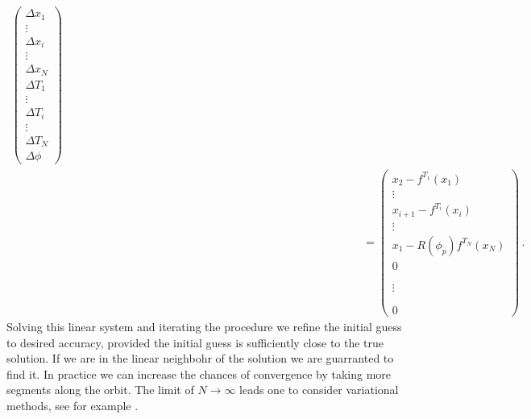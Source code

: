 \begin{eqnarray*}
{     \left(\begin{array}{c}
        \Delta x_1 \\
	\vdots\\
	\Delta x_i \\
	\vdots\\
	\Delta x_N \\
        \Delta T_1 \\
	\vdots	\\
	\Delta T_i \\
	\vdots	\\
	\Delta T_N \\	
	\Delta \phi
     \end{array}\right)}\\%
     & & 
     \hspace{300pt}=\left(\begin{array}{c}
	x_2-f^{T_1}(x_1)\\
	\vdots\\	
        x_{i+1}-f^{T_i}(x_i) \\
	\vdots\\
	x_{1}-R(\phi_p)f^{T_N}(x_N)\\
       	0    \\
	\\
	\\
	\vdots\\
	\\
	\\
	0
     \end{array}\right)\,.
     \label{eq:NewtonScheme}
\end{eqnarray*}
\normalsize
Solving this linear system and iterating the procedure we refine the initial guess to desired accuracy,
provided the initial guess is sufficiently close to the true solution. If we are in the linear neighbohr
of the solution we are guarranted to find it. In practice we can increase the chances of convergence 
by taking more segments along the orbit. The limit of $N\rightarrow\infty$ leads one to consider
variational methods, see for example .

